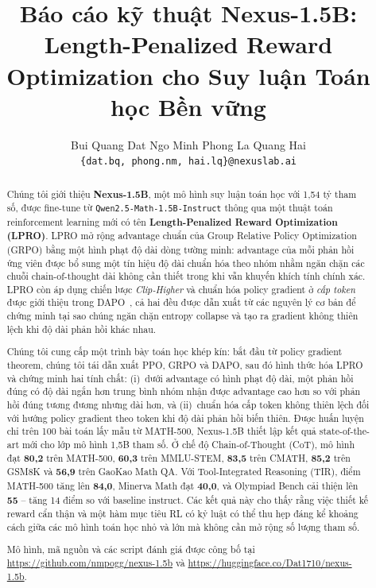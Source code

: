 \documentclass[11pt,a4paper]{article}
\title{\textbf{Báo cáo kỹ thuật Nexus-1.5B:}\\\textbf{Length-Penalized Reward Optimization cho Suy luận Toán học Bền vững}}
\author{
  Bui Quang Dat \quad Ngo Minh Phong \quad La Quang Hai \\
  \texttt{\{dat.bq, phong.nm, hai.lq\}@nexuslab.ai}
}
\date{}
\begin{document}
\maketitle

\begin{abstract}
Chúng tôi giới thiệu \textbf{Nexus-1.5B}, một mô hình suy luận toán học với 1,54 tỷ tham số,
được fine-tune từ \texttt{Qwen2.5-Math-1.5B-Instruct} thông qua một thuật toán
reinforcement learning mới có tên \textbf{Length-Penalized Reward Optimization (LPRO)}. LPRO
mở rộng advantage chuẩn của Group Relative Policy Optimization (GRPO) bằng một hình phạt
độ dài dòng tường minh: advantage của mỗi phản hồi ứng viên được bổ sung một tín hiệu
độ dài chuẩn hóa theo nhóm nhằm ngăn chặn các chuỗi chain-of-thought dài không cần thiết
trong khi vẫn khuyến khích tính chính xác. LPRO còn áp dụng chiến lược \emph{Clip-Higher}
và chuẩn hóa policy gradient ở \emph{cấp token} được giới thiệu trong
DAPO~\citep{yu2025dapo}, cả hai đều được dẫn xuất từ các nguyên lý cơ bản để
chứng minh tại sao chúng ngăn chặn entropy collapse và tạo ra gradient không thiên lệch
khi độ dài phản hồi khác nhau.

Chúng tôi cung cấp một trình bày toán học khép kín: bắt đầu từ policy gradient
theorem, chúng tôi tái dẫn xuất PPO, GRPO và DAPO, sau đó hình thức hóa LPRO và chứng minh hai
tính chất: (i)~dưới advantage có hình phạt độ dài, một phản hồi đúng có độ dài
ngắn hơn trung bình nhóm nhận được advantage cao hơn so với phản hồi đúng tương đương
nhưng dài hơn, và (ii)~chuẩn hóa cấp token không thiên lệch đối với
hướng policy gradient theo token khi độ dài phản hồi biến thiên. Được huấn luyện chỉ trên 100
bài toán lấy mẫu từ MATH-500, Nexus-1.5B thiết lập kết quả state-of-the-art mới
cho lớp mô hình 1,5B tham số. Ở chế độ Chain-of-Thought (CoT), mô hình đạt
\textbf{80,2} trên MATH-500, \textbf{60,3} trên MMLU-STEM, \textbf{83,5} trên CMATH,
\textbf{85,2} trên GSM8K và \textbf{56,9} trên GaoKao Math QA. Với Tool-Integrated
Reasoning (TIR), điểm MATH-500 tăng lên \textbf{84,0}, Minerva Math đạt
\textbf{40,0}, và Olympiad Bench cải thiện lên \textbf{55} -- tăng 14 điểm so với
baseline instruct. Các kết quả này cho thấy rằng việc thiết kế reward cẩn thận và một
hàm mục tiêu RL có kỷ luật có thể thu hẹp đáng kể khoảng cách giữa các mô hình toán học
nhỏ và lớn mà không cần mở rộng số lượng tham số.

Mô hình, mã nguồn và các script đánh giá được công bố tại
\url{https://github.com/nmpogg/nexus-1.5b} và
\url{https://huggingface.co/Dat1710/nexus-1.5b}.
\end{abstract}
\end{document}
